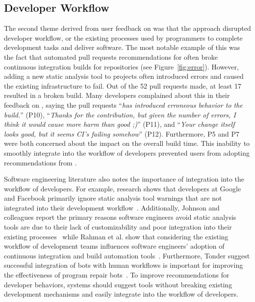 \subsection{Developer Workflow}

The second theme derived from user feedback on \toolone was that the \tele approach disrupted developer workflow, or the existing processes used by programmers to complete development tasks and deliver software. The most notable example of this was the fact that automated pull requests recommendations for \EP often broke continuous integration builds for repositories (see Figure~\ref{fig:error}). However, adding a new static analysis tool to projects often introduced errors and caused the existing infrastructure to fail. Out of the 52 pull requests made, at least 17 resulted in a broken build. Many developers complained about this in their feedback on \toolone, saying the pull requests ``\textit{has introduced erroneous behavior to the build.}'' (P10), ``\textit{Thanks for the contribution, but given the number of errors, I think it would cause more harm than good ;)}'' (P11), and ``\textit{Your change itself looks good, but it seems CI's failing somehow}'' (P12). Furthermore, P5 and P7 were both concerned about the impact on the overall build time. This inability to smoothly integrate into the workflow of developers prevented users from adopting \tele recommendations from \toolone.

Software engineering literature also notes the importance of integration into the workflow of developers. For example, research shows that developers at Google and Facebook primarily ignore static analysis tool warnings that are not integrated into their development workflow~\cite{sadowski2018lessons,Distefano2019Facebook}. Additionally, Johnson and colleagues report the primary reasons software engineers avoid static analysis tools are due to their lack of customizability and poor integration into their existing processes~\cite{Johnson2013Why} while Rahman et al. show that considering the existing workflow of development teams influences software engineers' adoption of continuous integration and build automation tools~\cite{Akond2017BuildTools}. Furthermore, Tonder suggest successful integration of bots with human workflows is important for improving the effectiveness of program repair bots~\cite{Tonder19ProgramRepairBots}. To improve recommendations for developer behaviors, systems should suggest tools without breaking existing development mechanisms and easily integrate into the workflow of developers.


